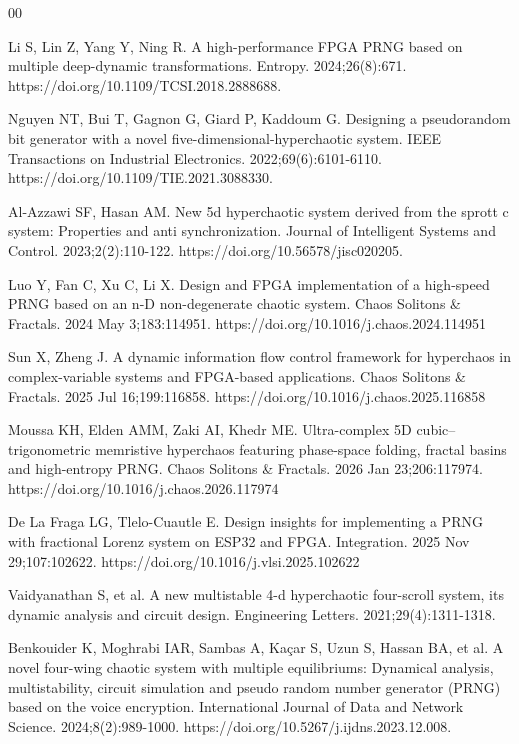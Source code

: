 \documentclass[preprint,12pt]{elsarticle}
\begin{document}
\begin{thebibliography}{00}


Li S, Lin Z, Yang Y, Ning R. A high-performance FPGA PRNG based on multiple deep-dynamic transformations. Entropy. 2024;26(8):671. https://doi.org/10.1109/TCSI.2018.2888688.

Nguyen NT, Bui T, Gagnon G, Giard P, Kaddoum G. Designing a pseudorandom bit generator with a novel five-dimensional-hyperchaotic system. IEEE Transactions on Industrial Electronics. 2022;69(6):6101-6110. https://doi.org/10.1109/TIE.2021.3088330.

Al-Azzawi SF, Hasan AM. New 5d hyperchaotic system derived from the sprott c system: Properties and anti synchronization. Journal of Intelligent Systems and Control. 2023;2(2):110-122. https://doi.org/10.56578/jisc020205.

Luo Y, Fan C, Xu C, Li X. Design and FPGA implementation of a high-speed PRNG based on an n-D non-degenerate chaotic system. Chaos Solitons \& Fractals. 2024 May 3;183:114951. https://doi.org/10.1016/j.chaos.2024.114951

Sun X, Zheng J. A dynamic information flow control framework for hyperchaos in complex-variable systems and FPGA-based applications. Chaos Solitons \& Fractals. 2025 Jul 16;199:116858. https://doi.org/10.1016/j.chaos.2025.116858

Moussa KH, Elden AMM, Zaki AI, Khedr ME. Ultra-complex 5D cubic–trigonometric memristive hyperchaos featuring phase-space folding, fractal basins and high-entropy PRNG. Chaos Solitons \& Fractals. 2026 Jan 23;206:117974. https://doi.org/10.1016/j.chaos.2026.117974

De La Fraga LG, Tlelo-Cuautle E. Design insights for implementing a PRNG with fractional Lorenz system on ESP32 and FPGA. Integration. 2025 Nov 29;107:102622. https://doi.org/10.1016/j.vlsi.2025.102622

Vaidyanathan S, et al. A new multistable 4-d hyperchaotic four-scroll system, its dynamic analysis and circuit design. Engineering Letters. 2021;29(4):1311-1318.

Benkouider K, Moghrabi IAR, Sambas A, Kaçar S, Uzun S, Hassan BA, et al. A novel four-wing chaotic system with multiple equilibriums: Dynamical analysis, multistability, circuit simulation and pseudo random number generator (PRNG) based on the voice encryption. International Journal of Data and Network Science. 2024;8(2):989-1000. https://doi.org/10.5267/j.ijdns.2023.12.008.


\end{thebibliography}
\end{document}
